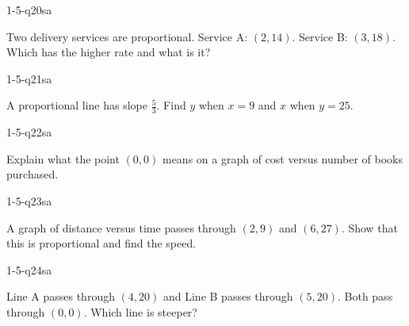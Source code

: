 \begin{practiceQuestion}{1-5-q20}{sa}
\begin{questionText}
Two delivery services are proportional. Service A: $(2, 14)$. Service B: $(3, 18)$. Which has the higher rate and what is it?
\end{questionText}
\end{practiceQuestion}

\begin{practiceQuestion}{1-5-q21}{sa}
\begin{questionText}
A proportional line has slope $\frac{5}{3}$. Find $y$ when $x = 9$ and $x$ when $y = 25$.
\end{questionText}
\end{practiceQuestion}

\begin{practiceQuestion}{1-5-q22}{sa}
\begin{questionText}
Explain what the point $(0, 0)$ means on a graph of cost versus number of books purchased.
\end{questionText}
\end{practiceQuestion}

\begin{practiceQuestion}{1-5-q23}{sa}
\begin{questionText}
A graph of distance versus time passes through $(2, 9)$ and $(6, 27)$. Show that this is proportional and find the speed.
\end{questionText}
\end{practiceQuestion}

\begin{practiceQuestion}{1-5-q24}{sa}
\begin{questionText}
Line A passes through $(4, 20)$ and Line B passes through $(5, 20)$. Both pass through $(0, 0)$. Which line is steeper?
\end{questionText}
\end{practiceQuestion}

